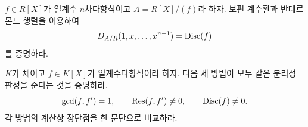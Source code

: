\begin{exercise}[*]
$f\in R[X]$가 일계수 $n$차다항식이고 $A=R[X]/(f)$라 하자. 보편 계수환과 반데르몬드 행렬을 이용하여
\[
  D_{A/R}(1,x,\dots,x^{n-1})=\operatorname{Disc}(f)
\]
를 증명하라.
\end{exercise}

\begin{exercise}
$K$가 체이고 $f\in K[X]$가 일계수다항식이라 하자. 다음 세 방법이 모두 같은 분리성 판정을 준다는 것을 증명하라.
\[
  \gcd(f,f')=1,
  \qquad
  \operatorname{Res}(f,f')\ne0,
  \qquad
  \operatorname{Disc}(f)\ne0.
\]
각 방법의 계산상 장단점을 한 문단으로 비교하라.
\end{exercise}
